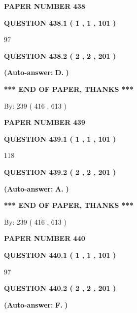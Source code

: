 \documentclass{ctexart}
\begin{document}
   
 {\textbf{ \Large{ PAPER NUMBER  438  }}}
   
   
   
   
  
  
{\textbf{\large{QUESTION
438.1 
 ( 1 , 1 , 101 )
}}}

97
  
  
{\textbf{\large{QUESTION
438.2 
 ( 2 , 2 , 201 )
}}}
 
 
{\textbf{(Auto-answer:}}
{\textbf{\large{
D.}}}
{\textbf{)}}
 
 
   
   
   
   
\vspace{1.0in} 
{\textbf{\large{ *** END OF PAPER, THANKS *** }}} 
   
   
\hspace{1.0in} By: 
 239 ( 416 ,  613 )
   
   
   
   
\newpage 
\setcounter{page}{ 
   439001 } 
   
   
 {\textbf{ \Large{ PAPER NUMBER  439  }}}
   
   
   
   
  
  
{\textbf{\large{QUESTION
439.1 
 ( 1 , 1 , 101 )
}}}

118
  
  
{\textbf{\large{QUESTION
439.2 
 ( 2 , 2 , 201 )
}}}
 
 
{\textbf{(Auto-answer:}}
{\textbf{\large{
A.}}}
{\textbf{)}}
 
 
   
   
   
   
\vspace{1.0in} 
{\textbf{\large{ *** END OF PAPER, THANKS *** }}} 
   
   
\hspace{1.0in} By: 
 239 ( 416 ,  613 )
   
   
   
   
\newpage 
\setcounter{page}{ 
   440001 } 
   
   
 {\textbf{ \Large{ PAPER NUMBER  440  }}}
   
   
   
   
  
  
{\textbf{\large{QUESTION
440.1 
 ( 1 , 1 , 101 )
}}}

97
  
  
{\textbf{\large{QUESTION
440.2 
 ( 2 , 2 , 201 )
}}}
 
 
{\textbf{(Auto-answer:}}
{\textbf{\large{
F.}}}
{\textbf{)}}
 
\end{document}
